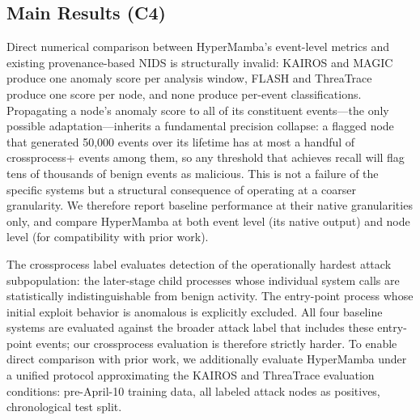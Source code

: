 \documentclass[letterpaper,twocolumn,10pt]{article}
\begin{document}
\subsection{Main Results (C4)}
\label{sec:main_results}

Direct numerical comparison between HyperMamba's event-level metrics and existing provenance-based NIDS is structurally invalid: KAIROS and MAGIC produce one anomaly score per analysis window, FLASH and ThreaTrace produce one score per node, and none produce per-event classifications. Propagating a node's anomaly score to all of its constituent events---the only possible adaptation---inherits a fundamental precision collapse: a flagged node that generated 50,000 events over its lifetime has at most a handful of crossprocess+ events among them, so any threshold that achieves recall will flag tens of thousands of benign events as malicious. This is not a failure of the specific systems but a structural consequence of operating at a coarser granularity. We therefore report baseline performance at their native granularities only, and compare HyperMamba at both event level (its native output) and node level (for compatibility with prior work).

The crossprocess label evaluates detection of the operationally hardest attack subpopulation: the later-stage child processes whose individual system calls are statistically indistinguishable from benign activity. The entry-point process whose initial exploit behavior is anomalous is explicitly excluded. All four baseline systems are evaluated against the broader attack label that includes these entry-point events; our crossprocess evaluation is therefore strictly harder. To enable direct comparison with prior work, we additionally evaluate HyperMamba under a unified protocol approximating the KAIROS and ThreaTrace evaluation conditions: pre-April-10 training data, all labeled attack nodes as positives, chronological test split.
\end{document}
